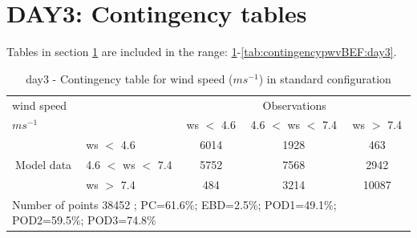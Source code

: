 \section{DAY3: Contingency tables}\label{sec:day3:cont}
Tables in section \ref{sec:day3:cont} are included in the range: \ref{tab:contingencywsBEF:day3}-\ref{tab:contingencypwvBEF:day3}.
\begin{table}[h!]
\begin{center}
\begin{tabular}{llccc}
\hline
{wind speed}                                       &                                                    & \multicolumn{3}{c}{Observations}                 \\
{$m s^{-1}$}                                       &                             & ws $<$ 4.6   & 4.6 $<$ ws $<$ 7.4 & ws $>$ 7.4 \\
\hline
\multicolumn{1}{c}{\multirow{3}{*}{Model data}}  & ws $<$ 4.6             & 6014                & 1928                       & 463              \\
                                                 & 4.6  $<$ ws $<$ 7.4 & 5752                & 7568                       & 2942              \\
                                                 & ws $>$ 7.4             & 484                & 3214                       & 10087              \\
\hline 
\multicolumn{5}{l}{ Number of points        38452 ; PC=61.6\%; EBD=2.5\%; POD1=49.1\%; POD2=59.5\%; POD3=74.8\%}                 \\
\end{tabular}
\end{center}
\caption{day3 - Contingency table for {wind speed} ($m s^{-1}$) in standard configuration}
\label{tab:contingencywsBEF:day3}
\end{table}
